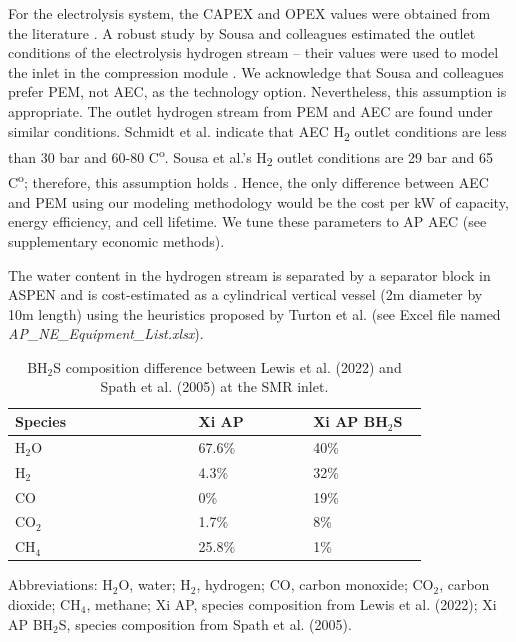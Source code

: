\documentclass{article}
\begin{document}
For the electrolysis system, the CAPEX and OPEX values were obtained from the literature \cite{Bohm2020, Schmidt2017}. A robust study by Sousa and colleagues estimated the outlet conditions of the electrolysis hydrogen stream – their values were used to model the inlet in the compression module \cite{Sousa2022}. We acknowledge that Sousa and colleagues prefer PEM, not AEC, as the technology option. Nevertheless, this assumption is appropriate. The outlet hydrogen stream from PEM and AEC are found under similar conditions. Schmidt et al. indicate that AEC H\textsubscript{2} outlet conditions are less than 30 bar and 60-80 C\textsuperscript{o}. Sousa et al.’s H\textsubscript{2} outlet conditions are 29 bar and 65 C\textsuperscript{o}; therefore, this assumption holds \cite{Sousa2022, Schmidt2017}. Hence, the only difference between AEC and PEM using our modeling methodology would be the cost per kW of capacity, energy efficiency, and cell lifetime. We tune these parameters to AP AEC (see supplementary economic methods).

The water content in the hydrogen stream is separated by a separator block in ASPEN and is cost-estimated as a cylindrical vertical vessel (2m diameter by 10m length) using the heuristics proposed by Turton et al. \cite{Turton2018} (see Excel file named \textit{AP\_NE\_Equipment\_List.xlsx}).

\begin{table}[H]
  \centering
  \caption{BH$_2$S composition difference between Lewis et al. (2022) and Spath et al. (2005) at the SMR inlet.}
  \label{table:si_technical3_bh2s_composition}
  \begin{threeparttable}
    \begin{tabular}{@{}p{0.4\linewidth}p{0.25\linewidth}p{0.25\linewidth}@{}}
      \toprule
      \textbf{Species} & \textbf{Xi AP} & \textbf{Xi AP BH$_2$S} \\ \midrule
      H$_2$O & 67.6\% & 40\% \\
      H$_2$ & 4.3\% & 32\% \\
      CO & 0\% & 19\% \\
      CO$_2$ & 1.7\% & 8\% \\
      CH$_4$ & 25.8\% & 1\% \\ \bottomrule
    \end{tabular}
    \begin{tablenotes}
      \small
      \item Abbreviations: H$_2$O, water; H$_2$, hydrogen; CO, carbon monoxide; CO$_2$, carbon dioxide; CH$_4$, methane; Xi AP, species composition from Lewis et al. (2022); Xi AP BH$_2$S, species composition from Spath et al. (2005).
    \end{tablenotes}
  \end{threeparttable}
\end{table}
\end{document}
